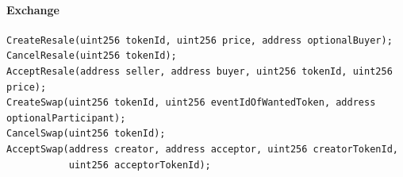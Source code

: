 \documentclass[a4paper,11pt,oneside]{report}
\begin{document}
\paragraph{Exchange}
\begin{verbatim}
CreateResale(uint256 tokenId, uint256 price, address optionalBuyer);
CancelResale(uint256 tokenId);
AcceptResale(address seller, address buyer, uint256 tokenId, uint256 price);
CreateSwap(uint256 tokenId, uint256 eventIdOfWantedToken, address optionalParticipant);
CancelSwap(uint256 tokenId);
AcceptSwap(address creator, address acceptor, uint256 creatorTokenId, 
           uint256 acceptorTokenId);
\end{verbatim}
\end{document}
